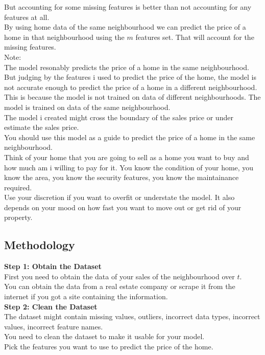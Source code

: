 But accounting for some missing features is better than not accounting for any features at all. \\
By using home data of the same neighbourhood we can predict the price of a home in that neighbourhood using the $m$ features set. That will account for the missing features. \\

Note: \\
The model resonably predicts the price of a home in the same neighbourhood. \\ But judging by the features i used to predict the price of the home, the model is not accurate enough to predict the price of a home in a different neighbourhood. \\
This is because the model is not trained on data of different neighbourhoods. The model is trained on data of the same neighbourhood. \\
The model i created might cross the boundary of the sales price or under estimate the sales price. \\ 
You should use this model as a guide to predict the price of a home in the same neighbourhood. \\ 
Think of your home that you are going to sell as a home you want to buy and how much am i willing to pay for it.
You know the condition of your home, you know the area, you know the security features, you know the maintainance required. \\
Use your discretion if you want to overfit or understate the model. It also depends on your mood on how fast you want to move out or get rid of your property. \\


\subsection{Methodology}

\textbf{Step 1: Obtain the Dataset} \\
First you need to obtain the data of your sales of the neighbourhood over $t$. \\
You can obtain the data from a real estate company or scrape it from the internet if you got a site containing the information. \\

\textbf{Step 2: Clean the Dataset} \\
The dataset might contain missing values, outliers, incorrect data types, incorrect values, incorrect feature names. \\
You need to clean the dataset to make it usable for your model. \\
Pick the features you want to use to predict the price of the home. \\

